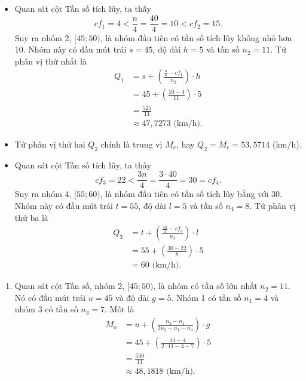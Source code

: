 \documentclass[
  letterpaper,
  DIV=11,
  numbers=noendperiod]{scrartcl}
\providecommand{\tightlist}{%
  \setlength{\itemsep}{0pt}\setlength{\parskip}{0pt}}\usepackage{longtable,booktabs,array}
\begin{document}
\begin{itemize}
\item
  Quan sát cột Tần số tích lũy, ta thấy \[
  cf_1=4 < \frac{n}{4}=\frac{40}{4}=10 < cf_2=15.
  \] Suy ra nhóm 2, \([45;50)\), là nhóm đầu tiên có tần số tích lũy
  không nhỏ hơn 10. Nhóm này có đầu mút trái \(s=45\), độ dài \(h=5\) và
  tần số \(n_2=11\). Tứ phân vị thứ nhất là \begin{align*}
        Q_1
            & = s + \left( \frac{\frac{n}{4}-cf_1}{n_2}\right)\cdot h \\
            & = 45 + \left(\frac{10-4}{11}\right)\cdot 5 \\
            & = \frac{525}{11} \\
            & \approx 47,7273 \text{ (km/h).}
    \end{align*}
\item
  Tứ phân vị thứ hai \(Q_2\) chính là trung vị \(M_e\), hay
  \(Q_2 = M_e = 53,5714\) (km/h).
\end{itemize}

\begin{itemize}
\tightlist
\item
  Quan sát cột Tần số tích lũy, ta thấy \[
  cf_3=22 < \frac{3n}{4} = \frac{3 \cdot 40}{4} = 30 = cf_4.
  \] Suy ra nhóm 4, \([55;60)\), là nhóm đầu tiên có tần số tích lũy
  bằng với 30. Nhóm này có đầu mút trái \(t=55\), độ dài \(l=5\) và tần
  số \(n_4=8\). Tứ phân vị thứ ba là \begin{align*}
        Q_3
            & = t + \left(\frac{\frac{3n}{4}-cf_3}{n_4}\right)\cdot l \\
            & = 55 + \left(\frac{30-22}{8}\right)\cdot 5 \\
            & = 60 \text{ (km/h).}
    \end{align*}
\end{itemize}

\begin{enumerate}
\def\labelenumi{\alph{enumi}.}
\setcounter{enumi}{2}
\tightlist
\item
  Quan sát cột Tần số, nhóm 2, \([45;50)\), là nhóm có tần số lớn nhất
  \(n_2=11\). Nó có đầu mút trái \(u=45\) và độ dài \(g=5\). Nhóm 1 có
  tần số \(n_1=4\) và nhóm 3 có tần số \(n_3=7\). Mốt là \begin{align*}
       M_o
           & = u + \left(\frac{n_2-n_1}{2n_2-n_1-n_3}\right) \cdot g \\
           & = 45 + \left(\frac{11-4}{2\cdot 11-4-7}\right)\cdot 5 \\
           & = \frac{530}{11} \\
           & \approx 48,1818 \text{ (km/h)}.
   \end{align*}
\end{enumerate}
\end{document}
